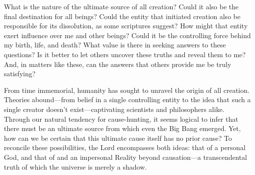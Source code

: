 \newpage
\begin{mananam}{}
\normalfont\mananamtext What is the nature of the ultimate source of all creation? Could it also be the final destination for all beings? Could the entity that initiated creation also be responsible for its dissolution, as some scriptures suggest? 
How might that entity exert influence over me and other beings? Could it be the controlling force behind my birth, life, and death? What value is there in seeking answers to these questions? Is it better to let others uncover these truths and reveal them to me? And, in matters like these, can the answers that others provide me be truly satisfying? 
\end{mananam}
\sreflect
\begin{inspiration}{}
\normalfont\mananamtext From time immemorial, humanity has sought to unravel the origin of all creation. Theories abound—from belief in a single controlling entity to the idea that such a single creator doesn’t exist—captivating scientists and philosophers alike. Through our natural tendency for cause-hunting, it seems logical to infer that there must be an ultimate source from which even the Big Bang emerged. Yet, how can we be certain that this ultimate cause itself has no prior cause? To reconcile these possibilities, the Lord encompasses both ideas: that of a personal God, and that of and an impersonal Reality beyond causation—a transcendental truth of which the universe is merely a shadow. 
\end{inspiration}
\newpage

